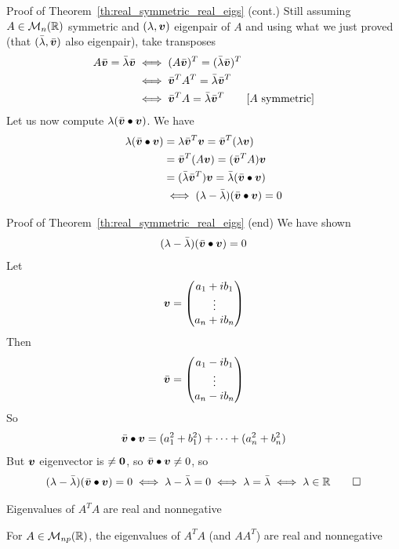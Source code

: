 \documentclass[aspectratio=169]{beamer}\usepackage[]{graphicx}\usepackage[]{xcolor}
\begin{document}
\begin{frame}{Proof of Theorem~\ref{th:real_symmetric_real_eigs} (cont.)}
Still assuming $A\in\mathcal{M}_n(\mathbb{R})$ symmetric and $(\lambda,\bm{v})$ eigenpair of $A$ and using what we just proved (that $(\bar\lambda,\bar{\bm{v}})$ also eigenpair), take transposes
\begin{align*}
A\bar{\bm{v}} = \bar\lambda\bar{\bm{v}} &\iff (A\bar{\bm{v}})^T = (\bar\lambda\bar{\bm{v}})^T \\
&\iff \bar{\bm{v}}^TA^T=\bar\lambda\bar{\bm{v}}^T \\
&\iff \bar{\bm{v}}^T A = \bar\lambda\bar{\bm{v}}^T \qquad{\textrm{[$A$ symmetric]}}
\end{align*}
\vfill
Let us now compute $\lambda (\bar{\bm{v}}\bullet\bm{v})$. We have
\begin{align*}
\lambda (\bar{\bm{v}}\bullet\bm{v}) &= \lambda\bar{\bm{v}}^T\bm{v} = \bar{\bm{v}}^T(\lambda\bm{v}) \\
&= \bar{\bm{v}}^T(A\bm{v}) = (\bar{\bm{v}}^TA)\bm{v} \\
&= (\bar\lambda\bar{\bm{v}}^T)\bm{v} = \bar\lambda(\bar{\bm{v}}\bullet\bm{v}) \\
&\iff (\lambda-\bar\lambda)(\bar{\bm{v}}\bullet\bm{v}) = 0
\end{align*}
\end{frame}

\begin{frame}{Proof of Theorem~\ref{th:real_symmetric_real_eigs} (end)}
We have shown
\[
(\lambda-\bar\lambda)(\bar{\bm{v}}\bullet\bm{v}) = 0
\]
Let 
\[
\bm{v} = \begin{pmatrix}
a_1+ib_1 \\
\vdots \\
a_n+ib_n
\end{pmatrix}
\]
Then
\[
\bar{\bm{v}} = \begin{pmatrix}
a_1-ib_1 \\
\vdots \\
a_n-ib_n
\end{pmatrix}
\]
So
\[
\bar{\bm{v}}\bullet\bm{v} = (a_1^2+b_1^2)+\cdots+(a_n^2+b_n^2)
\]
But $\bm{v}$ eigenvector is $\neq\b0$, so $\bar{\bm{v}}\bullet\bm{v}\neq 0$, so
\[
(\lambda-\bar\lambda)(\bar{\bm{v}}\bullet\bm{v}) = 0
\iff \lambda-\bar\lambda=0
\iff \lambda=\bar\lambda\iff \lambda\in\mathbb{R}\qed
\]
\end{frame}


\begin{frame}{Eigenvalues of $A^TA$ are real and nonnegative}
\begin{importanttheorem}\label{th:eigenvalues_ATA_nonnegative}
For $A\in\mathcal{M}_{np}(\mathbb{R})$, the eigenvalues of $A^TA$ (and $AA^T$) are real and nonnegative
\end{importanttheorem}
\end{frame}
\end{document}
